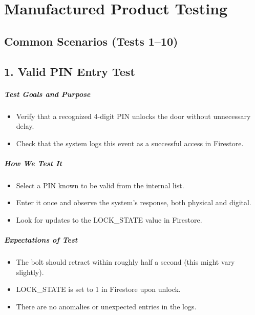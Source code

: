 \newpage
\section{Manufactured Product Testing}

\subsection*{Common Scenarios (Tests 1–10)}

\subsection*{1. Valid PIN Entry Test}
\subparagraph{Test Goals and Purpose}
\begin{itemize}
    \item Verify that a recognized 4-digit PIN unlocks the door without unnecessary delay.
    \item Check that the system logs this event as a successful access in Firestore.
\end{itemize}
\subparagraph{How We Test It}
\begin{itemize}
    \item Select a PIN known to be valid from the internal list.
    \item Enter it once and observe the system's response, both physical and digital.
    \item Look for updates to the LOCK\_STATE value in Firestore.
\end{itemize}
\subparagraph{Expectations of Test}
\begin{itemize}
    \item The bolt should retract within roughly half a second (this might vary slightly).
    \item LOCK\_STATE is set to 1 in Firestore upon unlock.
    \item There are no anomalies or unexpected entries in the logs.
\end{itemize}

